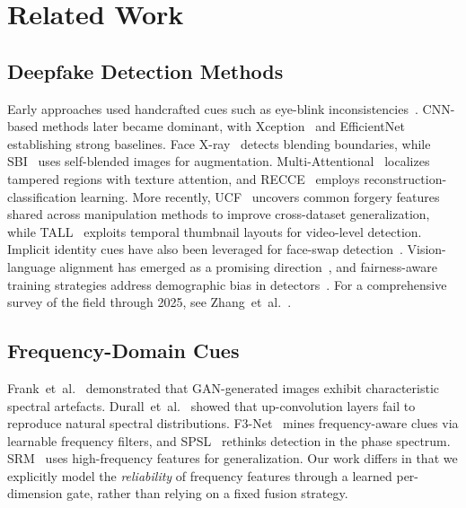 \documentclass[conference]{IEEEtran}
\begin{document}
\section{Related Work}

\subsection{Deepfake Detection Methods}
Early approaches used handcrafted cues such as eye-blink inconsistencies~\cite{li2018ictu}. CNN-based methods later became dominant, with Xception~\cite{chollet2017xception,rossler2019faceforensics} and EfficientNet~\cite{tan2019efficientnet} establishing strong baselines.
Face X-ray~\cite{li2020facexray} detects blending boundaries, while SBI~\cite{shiohara2022sbi} uses self-blended images for augmentation.
Multi-Attentional~\cite{zhao2021multiattentional} localizes tampered regions with texture attention, and RECCE~\cite{cao2022recce} employs reconstruction-classification learning.
More recently, UCF~\cite{yan2023ucf} uncovers common forgery features shared across manipulation methods to improve cross-dataset generalization, while TALL~\cite{xu2023tall} exploits temporal thumbnail layouts for video-level detection.
Implicit identity cues have also been leveraged for face-swap detection~\cite{dong2023implicit}.
Vision-language alignment has emerged as a promising direction~\cite{sun2024towards}, and fairness-aware training strategies address demographic bias in detectors~\cite{lin2024preserving}.
For a comprehensive survey of the field through 2025, see Zhang~et~al.~\cite{zhang2025survey}.

\subsection{Frequency-Domain Cues}
Frank~et~al.~\cite{frank2020leveraging} demonstrated that GAN-generated images exhibit characteristic spectral artefacts.
Durall~et~al.~\cite{durall2020watch} showed that up-convolution layers fail to reproduce natural spectral distributions.
F3-Net~\cite{qian2020f3net} mines frequency-aware clues via learnable frequency filters, and SPSL~\cite{liu2021spsl} rethinks detection in the phase spectrum.
SRM~\cite{luo2021hf} uses high-frequency features for generalization.
Our work differs in that we explicitly model the \emph{reliability} of frequency features through a learned per-dimension gate, rather than relying on a fixed fusion strategy.
\end{document}
